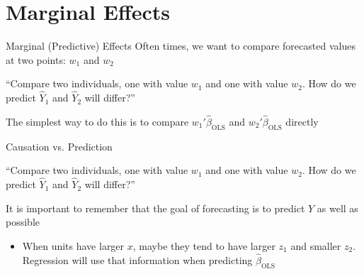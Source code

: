\documentclass[aspectratio=169,t,11pt,table]{beamer}
\begin{document}
\section{Marginal Effects}

\begin{frame}{Marginal (Predictive) Effects}
  Often times, we want to compare forecasted values at two points: $w_1$ and $w_2$

  \begin{tcolorbox}[boxrule = 0pt, frame hidden, sharp corners, enhanced, borderline west = {2pt}{0pt}{blue}, interior hidden]
    ``Compare two individuals, one with value $w_1$ and one with value $w_2$. How do we predict $\hat{Y}_1$ and $\hat{Y}_2$ will differ?''
  \end{tcolorbox}

  The simplest way to do this is to compare $w_1' \hat{\beta}_{\text{OLS}}$ and $w_2' \hat{\beta}_{\text{OLS}}$ directly
\end{frame}

\begin{frame}{Causation vs. Prediction}
  \begin{tcolorbox}[boxrule = 0pt, frame hidden, sharp corners, enhanced, borderline west = {2pt}{0pt}{blue}, interior hidden]
    ``Compare two individuals, one with value $w_1$ and one with value $w_2$. How do we predict $\hat{Y}_1$ and $\hat{Y}_2$ will differ?''
  \end{tcolorbox}
  
  It is important to remember that the goal of forecasting is to predict $Y$ as well as possible
  \begin{itemize}
    \item When units have larger $x$, maybe they tend to have larger $z_1$ and smaller $z_2$. Regression will use that information when predicting $\hat{\beta}_{\text{OLS}}$
  \end{itemize}
\end{frame}
\end{document}
